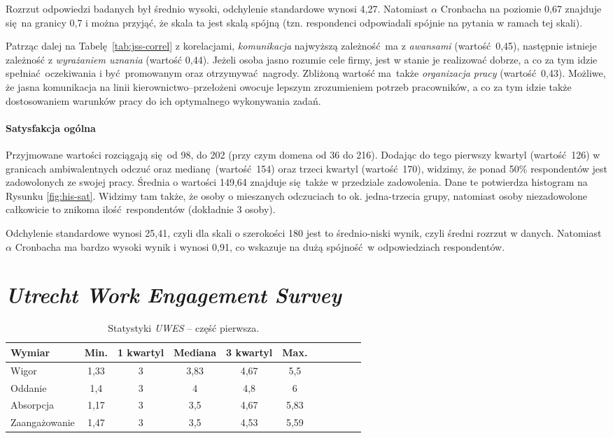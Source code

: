 Rozrzut odpowiedzi badanych był średnio wysoki, odchylenie standardowe wynosi 4,27. Natomiast $\alpha$ Cronbacha na poziomie 0,67 znajduje się na granicy 0,7 i można przyjąć, że skala ta jest skalą spójną (tzn. respondenci odpowiadali spójnie na pytania w ramach tej skali).

Patrząc dalej na Tabelę \ref{tab:jss-correl} z korelacjami, \textit{komunikacja} najwyższą zależność ma z \textit{awansami} (wartość 0,45), następnie istnieje zależność z \textit{wyrażaniem uznania} (wartość 0,44). Jeżeli osoba jasno rozumie cele firmy, jest w stanie je realizować dobrze, a co za tym idzie spełniać oczekiwania i być promowanym oraz otrzymywać nagrody. Zbliżoną wartość ma także \textit{organizacja pracy} (wartość 0,43). Możliwe, że jasna komunikacja na linii
kierownictwo--przełożeni owocuje lepszym zrozumieniem potrzeb pracowników, a co za tym idzie także dostosowaniem warunków pracy do ich optymalnego wykonywania zadań.

\paragraph{Satysfakcja ogólna}
Przyjmowane wartości rozciągają się od 98, do 202 (przy czym domena od 36 do 216). Dodając do tego pierwszy kwartyl (wartość 126) w granicach ambiwalentnych odczuć oraz medianę (wartość 154) oraz trzeci kwartyl (wartość 170), widzimy, że ponad 50\% respondentów jest zadowolonych ze swojej pracy. Średnia o wartości 149,64 znajduje się także w przedziale zadowolenia. Dane te potwierdza histogram na Rysunku \ref{fig:his-sat}. Widzimy tam także, że osoby o mieszanych odczuciach to ok.
jedna-trzecia grupy, natomiast osoby niezadowolone całkowicie to znikoma ilość respondentów (dokładnie 3 osoby).

Odchylenie standardowe wynosi 25,41, czyli dla skali o szerokości 180 jest to średnio-niski wynik, czyli średni rozrzut w danych. Natomiast $\alpha$ Cronbacha ma bardzo wysoki wynik i wynosi 0,91, co wskazuje na dużą spójność w odpowiedziach respondentów.

\section{\emph{Utrecht Work Engagement Survey}}

\begin{table}[h!]
\begin{center}
\begin{tabular}{l | c c c c c c c c c c}
Wymiar & Min. & 1 kwartyl & Mediana & 3 kwartyl & Max.\\ \hline \hline
Wigor & 1,33 & 3 & 3,83 & 4,67 & 5,5 \\
Oddanie & 1,4 & 3 & 4 & 4,8 & 6 \\
Absorpcja & 1,17 & 3 & 3,5 & 4,67 & 5,83 \\ \hline
Zaangażowanie & 1,47 & 3 & 3,5 & 4,53 & 5,59 \\
\end{tabular}
\end{center}
\caption{Statystyki \emph{UWES} -- część pierwsza.}
\label{tab:uwes-stats-1}
\end{table}

